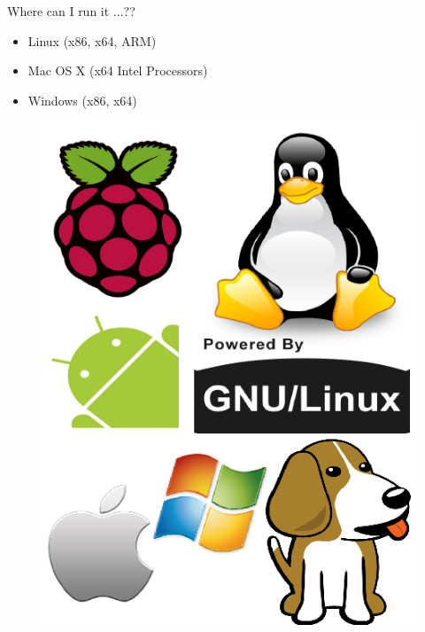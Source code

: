 \documentclass[bigger]{beamer}
\begin{document}
\begin{frame}{ Where can I run it ...??}
\begin{minipage}{0.47\textwidth}
\begin{itemize}
	\item Linux (x86, x64, ARM)
	\item Mac OS X (x64 Intel Processors)
	\item Windows (x86, x64)
\end{itemize}
\end{minipage}
\begin{minipage}{0.5\textwidth}
\begin{figure}[h]
		\includegraphics[scale = 0.25]{Imagenes/platforms.png}
\end{figure}
\end{minipage}
\end{frame}

\end{document}
